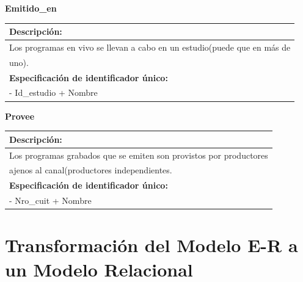 \documentclass[a4paper,10pt]{article}
\begin{document}
    \begin{flushleft}
      \begin{large} \bf{Emitido\_en} \end{large}
    \end{flushleft}
      \begin{tabular}{| p{2cm} | p{9cm} |}
	\hline
	\multicolumn{2}{|l|}{\bf{Descripci\'on:}} \\
	\hline
	\multicolumn{2}{|l|}{Los programas en vivo se llevan a cabo en un estudio(puede que en m\'as de} \\
	\multicolumn{2}{|l|}{uno).} \\	
	\hline
	\multicolumn{2}{|l|}{\bf{Especificaci\'on de identificador \'unico:}} \\
	\hline
	\multicolumn{2}{|l|}{- Id\_estudio + Nombre} \\
	\hline
      \end{tabular} 
      
    \begin{flushleft}
      \begin{large} \bf{Provee} \end{large}
    \end{flushleft}
      \begin{tabular}{| p{2cm} | p{9cm} |}
	\hline
	\multicolumn{2}{|l|}{\bf{Descripci\'on:}} \\
	\hline
	\multicolumn{2}{|l|}{Los programas grabados que se emiten son provistos por productores} \\
	\multicolumn{2}{|l|}{ajenos al canal(productores independientes.} \\	
	\hline		
	\multicolumn{2}{|l|}{\bf{Especificaci\'on de identificador \'unico:}} \\
	\hline
	\multicolumn{2}{|l|}{- Nro\_cuit + Nombre} \\
	\hline
      \end{tabular}

\newpage
\section{Transformaci\'on del Modelo E-R a un Modelo Relacional}
\end{document}
